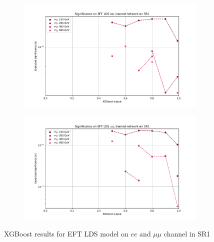 \documentclass[12pt, a4paper]{book}
\begin{document}
\begin{figure}[!ht]
\begin{subfigure}[b]{0.49\textwidth}
      \includegraphics[width=1\textwidth]{XGBoost/Model_independent/50-100/EFT_LDS/EXP_SIG_ee.pdf}
   \end{subfigure}
   \hfill
   \begin{subfigure}[b]{0.49\textwidth}
      \centering
      \includegraphics[width=1\textwidth]{XGBoost/Model_independent/50-100/EFT_LDS/EXP_SIG_uu.pdf}
   \end{subfigure}
   \caption{XGBoost results for EFT LDS model on $ee$ and $\mu\mu$ channel in SR1}\label{fig:EFT_LDS_SR1}
\end{figure}
\end{document}

